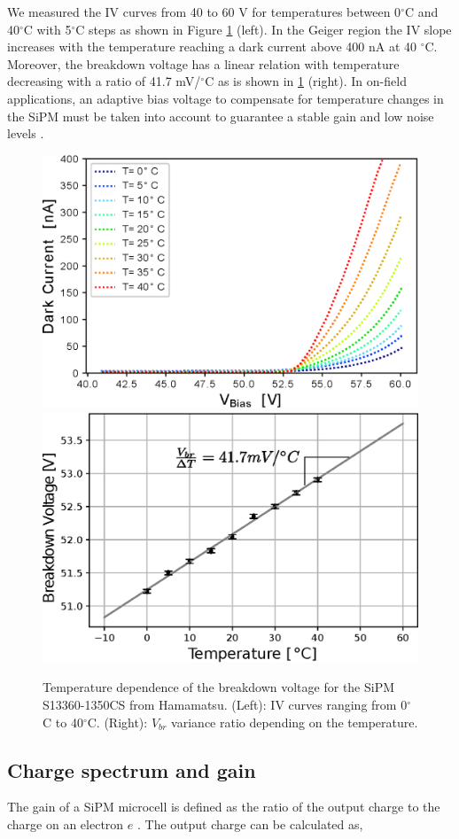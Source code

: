 \documentclass[a4paper,11pt]{article}
\begin{document}
We measured the IV curves from 40 to 60 V for temperatures between 0$^{\circ}$C and 40$^{\circ}$C with 5$^{\circ}$C steps as shown in Figure  \ref{fig:IVcurve} (left). In the Geiger region the IV slope increases with the temperature reaching a dark current above 400 nA at 40 $^{\circ}$C. Moreover, the breakdown voltage has a linear relation with temperature decreasing with a ratio of 41.7 mV/$^{\circ}$C as is shown in \ref{fig:IVcurve} (right). In on-field applications, an adaptive bias voltage to compensate for temperature changes in the SiPM must be taken into account to guarantee a stable gain and low noise levels \cite{Eigen2019}.

\begin{figure}[htbp]
\centering %
\includegraphics[width=.47\textwidth]{Figures/dc_13360.eps}
\qquad
\includegraphics[width=.47\textwidth]{Figures/Vbd_vs_T_S13360.eps}
\caption{\label{fig:IVcurve} Temperature dependence of the breakdown voltage for the SiPM S13360-1350CS from Hamamatsu. (Left): IV curves ranging from 0$^{\circ}$C to 40$^{\circ}$C. (Right): $V_{br}$ variance ratio depending on the temperature.}
\end{figure}

\subsection{Charge spectrum and gain}

The gain of a SiPM microcell is defined as the ratio of the output charge to the charge on an electron $e$ \cite{Acerbi2019}. The output charge can be calculated as,
\end{document}
